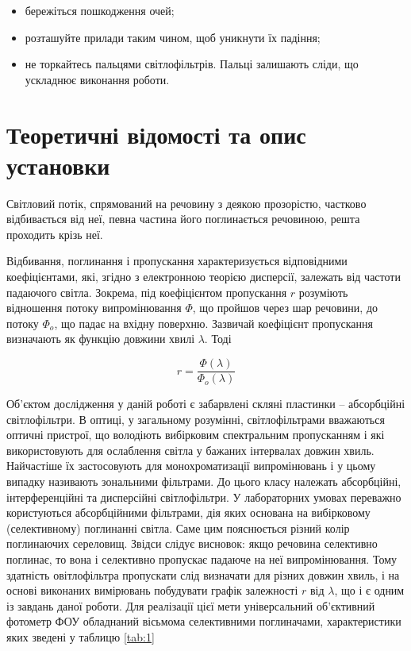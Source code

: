 \documentclass[onecolumn]{el-author}
\begin{document}
\begin{itemize}
	\item  бережіться пошкодження очей;
	\item  розташуйте прилади таким чином, щоб уникнути їх падіння;
	\item  не торкайтесь пальцями світлофільтрів. Пальці залишають
сліди, що ускладнює виконання роботи.
\end{itemize}

\section{Теоретичні відомості та опис установки}

Світловий потік, спрямований на речовину з деякою прозорістю,
частково відбивається від неї, певна частина його поглинається речовиною,
решта проходить крізь неї.

Відбивання, поглинання і пропускання характеризується відповідними
коефіцієнтами, які, згідно з електронною теорією дисперсії, залежать від
частоти падаючого світла. Зокрема, під коефіцієнтом пропускання $r$
розуміють відношення потоку випромінювання $\Phi$, що пройшов через шар
речовини, до потоку $\Phi _{o}$, що падає на вхідну поверхню. Зазвичай коефіцієнт
пропускання визначають як функцію довжини хвилі $\lambda$. Тоді

\begin{equation} \label{eq:1}
r = \frac{\Phi (\lambda)}{\Phi _{o} (\lambda)}
\end{equation}

Об'єктом дослідження у даній роботі є забарвлені скляні пластинки --
абсорбційні світлофільтри. В оптиці, у загальному розумінні,
світлофільтрами вважаються оптичні пристрої, що володіють вибірковим
спектральним пропусканням і які використовують для ослаблення світла у
бажаних інтервалах довжин хвиль. Найчастіше їх застосовують для
монохроматизації випромінювань і у цьому випадку називають зональними
фільтрами. До цього класу належать абсорбційні, інтерференційні та
дисперсійні світлофільтри. У лабораторних умовах переважно користуються
абсорбційними фільтрами, дія яких основана на вибірковому (селективному)
поглинанні світла. Саме цим пояснюється різний колір поглинаючих
сереловищ. Звідси слідує висновок: якщо речовина селективно поглинає, то
вона і селективно пропускає падаюче на неї випромінювання. Тому здатність
овітлофільтра пропускати слід визначати для різних довжин хвиль, і на
основі виконаних вимірювань побудувати графік залежності $r$ від $\lambda$, що і є
одним із завдань даної роботи. Для реалізації цієї мети універсальний
об'єктивний фотометр  ФОУ обладнаний вісьмома  селективними
поглиначами, характеристики яких зведені у таблицю \ref{tab:1}
\end{document}
